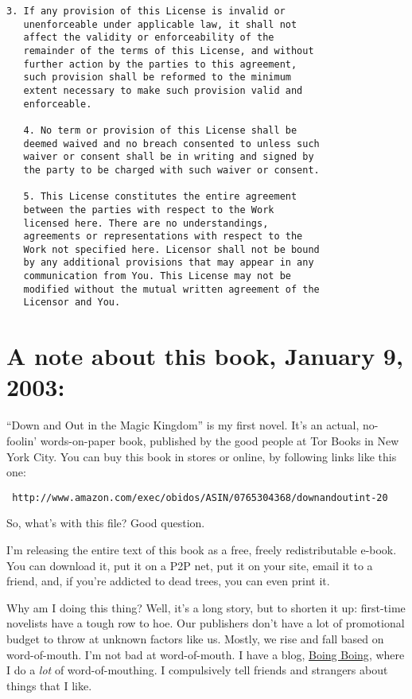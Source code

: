 \begin{Verbatim}[fontsize=\scriptsize]
   3. If any provision of this License is invalid or
   unenforceable under applicable law, it shall not
   affect the validity or enforceability of the
   remainder of the terms of this License, and without
   further action by the parties to this agreement,
   such provision shall be reformed to the minimum
   extent necessary to make such provision valid and
   enforceable.

   4. No term or provision of this License shall be
   deemed waived and no breach consented to unless such
   waiver or consent shall be in writing and signed by
   the party to be charged with such waiver or consent.

   5. This License constitutes the entire agreement
   between the parties with respect to the Work
   licensed here. There are no understandings,
   agreements or representations with respect to the
   Work not specified here. Licensor shall not be bound
   by any additional provisions that may appear in any
   communication from You. This License may not be
   modified without the mutual written agreement of the
   Licensor and You.
\end{Verbatim}
\section{A note about this book, January 9, 2003:}

“Down and Out in the Magic Kingdom” is my first novel. It's an
actual, no-foolin' words-on-paper book, published by the good
people at Tor Books in New York City. You can buy this book in
stores or online, by following links like this one:

\texttt{\scriptsize
http://www.amazon.com/exec/obidos/ASIN/0765304368/downandoutint-20}

So, what's with this file? Good question.

I'm releasing the entire text of this book as a free, freely
redistributable e-book. You can download it, put it on a P2P net,
put it on your site, email it to a friend, and, if you're addicted
to dead trees, you can even print it.

Why am I doing this thing? Well, it's a long story, but to shorten
it up: first-time novelists have a tough row to hoe. Our publishers
don't have a lot of promotional budget to throw at unknown factors
like us. Mostly, we rise and fall based on word-of-mouth. I'm not
bad at word-of-mouth. I have a blog,
\href{http://boingboing.net}{Boing Boing}, where I do a \emph{lot} of
word-of-mouthing. I compulsively tell friends and strangers about
things that I like.

